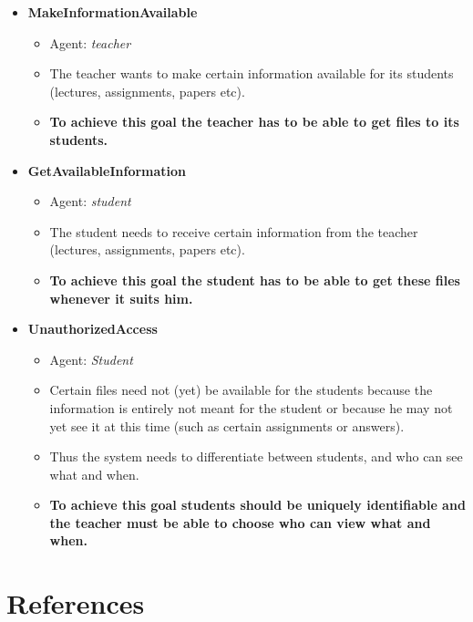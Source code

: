 \begin{itemize}
	\item \textbf{MakeInformationAvailable}
	\begin{itemize}
		\item Agent: \emph{teacher}
		\item The teacher wants to make certain information available for its students (lectures, assignments, papers etc).
		\item \textbf{To achieve this goal the teacher has to be able to get files to its students.}
	\end{itemize}
	
	\item \textbf{GetAvailableInformation}
	\begin{itemize}
		\item Agent: \emph{student}
		\item The student needs to receive certain information from the teacher (lectures, assignments, papers etc).
		\item \textbf{To achieve this goal the student has to be able to get these files whenever it suits him.}
	\end{itemize}
	
	\item \textbf{UnauthorizedAccess}
	\begin{itemize}
		\item Agent: \emph{Student}
		\item Certain files need not (yet) be available for the students because the information is entirely not meant for the student or because he may not yet see it at this time (such as certain assignments or answers).
		\item Thus the system needs to differentiate between students, and who can see what and when. 
		\item \textbf{To achieve this goal students should be uniquely identifiable and the teacher must be able to choose who can view what and when.}
	\end{itemize}
\end{itemize}

\chapter{References}

\begin{thebibliography}{9}
	
\end{thebibliography}


\appendix




